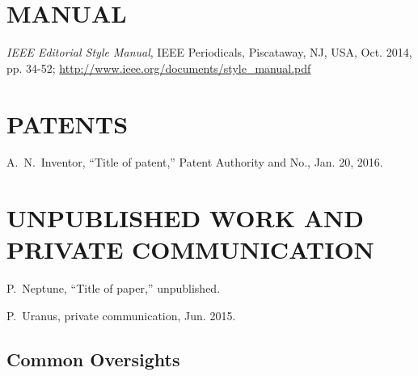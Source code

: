 \section{MANUAL}

\begin{thebibliography}{99} %
	\setcounter{enumi}{16}
		\emph{IEEE Editorial Style Manual},
		IEEE Periodicals,
		Piscataway, NJ, USA, Oct. 2014, pp. 34-52;
		\url{http://www.ieee.org/documents/style_manual.pdf} 
\end{thebibliography}

\section{PATENTS}

\begin{thebibliography}{99} %
	\setcounter{enumi}{17}
		A.~N.~Inventor,
		“Title of patent,”
		Patent Authority and No., Jan. 20, 2016.

\end{thebibliography}

\section{UNPUBLISHED WORK AND PRIVATE COMMUNICATION}

\begin{thebibliography}{99} %
	\setcounter{enumi}{18}
		P.~Neptune, “Title of paper,” unpublished.
	
	P.~Uranus, private communication, Jun. 2015.

\end{thebibliography}

\newpage

\flushcolsend

\subsection{Common Oversights}

